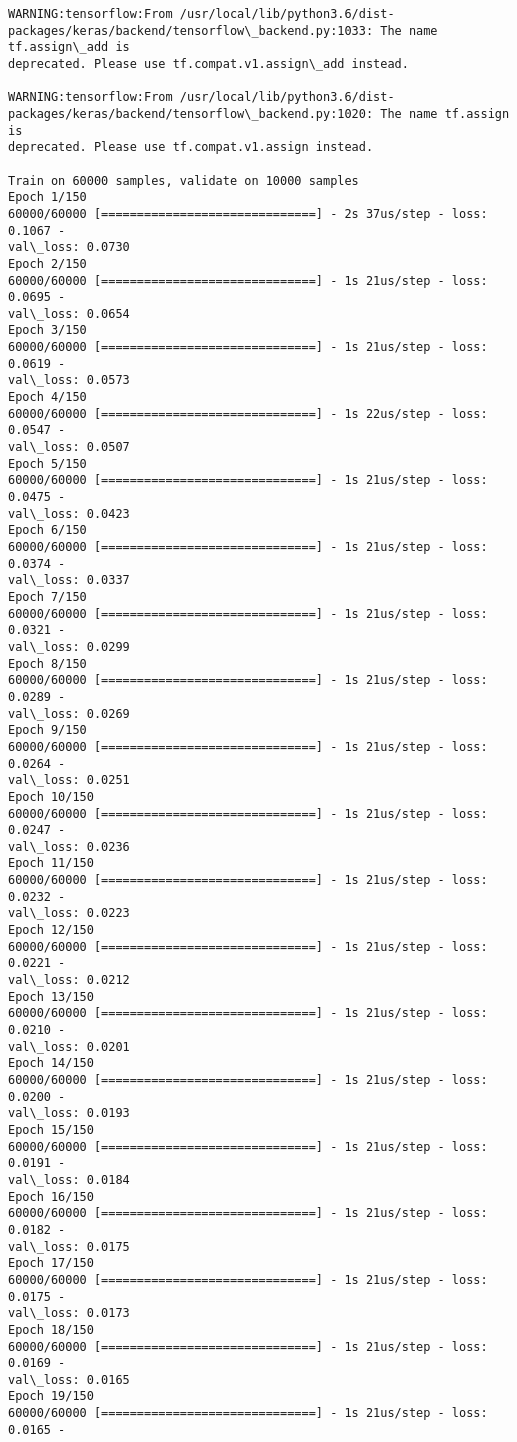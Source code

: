 \documentclass[11pt]{article}
\begin{document}
    \begin{Verbatim}[commandchars=\\\{\}]
WARNING:tensorflow:From /usr/local/lib/python3.6/dist-
packages/keras/backend/tensorflow\_backend.py:1033: The name tf.assign\_add is
deprecated. Please use tf.compat.v1.assign\_add instead.

WARNING:tensorflow:From /usr/local/lib/python3.6/dist-
packages/keras/backend/tensorflow\_backend.py:1020: The name tf.assign is
deprecated. Please use tf.compat.v1.assign instead.

Train on 60000 samples, validate on 10000 samples
Epoch 1/150
60000/60000 [==============================] - 2s 37us/step - loss: 0.1067 -
val\_loss: 0.0730
Epoch 2/150
60000/60000 [==============================] - 1s 21us/step - loss: 0.0695 -
val\_loss: 0.0654
Epoch 3/150
60000/60000 [==============================] - 1s 21us/step - loss: 0.0619 -
val\_loss: 0.0573
Epoch 4/150
60000/60000 [==============================] - 1s 22us/step - loss: 0.0547 -
val\_loss: 0.0507
Epoch 5/150
60000/60000 [==============================] - 1s 21us/step - loss: 0.0475 -
val\_loss: 0.0423
Epoch 6/150
60000/60000 [==============================] - 1s 21us/step - loss: 0.0374 -
val\_loss: 0.0337
Epoch 7/150
60000/60000 [==============================] - 1s 21us/step - loss: 0.0321 -
val\_loss: 0.0299
Epoch 8/150
60000/60000 [==============================] - 1s 21us/step - loss: 0.0289 -
val\_loss: 0.0269
Epoch 9/150
60000/60000 [==============================] - 1s 21us/step - loss: 0.0264 -
val\_loss: 0.0251
Epoch 10/150
60000/60000 [==============================] - 1s 21us/step - loss: 0.0247 -
val\_loss: 0.0236
Epoch 11/150
60000/60000 [==============================] - 1s 21us/step - loss: 0.0232 -
val\_loss: 0.0223
Epoch 12/150
60000/60000 [==============================] - 1s 21us/step - loss: 0.0221 -
val\_loss: 0.0212
Epoch 13/150
60000/60000 [==============================] - 1s 21us/step - loss: 0.0210 -
val\_loss: 0.0201
Epoch 14/150
60000/60000 [==============================] - 1s 21us/step - loss: 0.0200 -
val\_loss: 0.0193
Epoch 15/150
60000/60000 [==============================] - 1s 21us/step - loss: 0.0191 -
val\_loss: 0.0184
Epoch 16/150
60000/60000 [==============================] - 1s 21us/step - loss: 0.0182 -
val\_loss: 0.0175
Epoch 17/150
60000/60000 [==============================] - 1s 21us/step - loss: 0.0175 -
val\_loss: 0.0173
Epoch 18/150
60000/60000 [==============================] - 1s 21us/step - loss: 0.0169 -
val\_loss: 0.0165
Epoch 19/150
60000/60000 [==============================] - 1s 21us/step - loss: 0.0165 -

\end{Verbatim}
\end{document}
